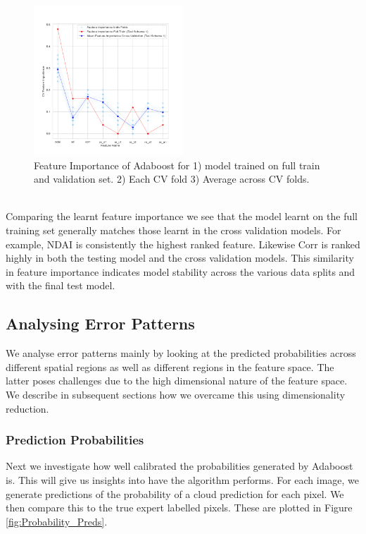 \documentclass[11pt, letterpaper, journal]{IEEEtran}
\begin{document}
\begin{figure}[h]
\centering
\includegraphics[width=0.5\textwidth]{statics/Feature_importance_test_scheme1.png}
\caption{Feature Importance of Adaboost for 1) model trained on full train and validation set. 2) Each CV fold 3) Average across CV folds.}
\label{fig:Feature_importance ts1}
\end{figure}

\\
Comparing the learnt feature importance we see that the model learnt on the full training set generally matches those learnt in the cross validation models. For example, NDAI is consistently the highest ranked feature. Likewise Corr is ranked highly in both the testing model and the cross validation models. This similarity in feature importance indicates model stability across the various data splits and with the final test model. 

\subsection{Analysing Error Patterns}
We analyse error patterns mainly by looking at the predicted probabilities across different spatial regions as well as different regions in the feature space. The latter poses challenges due to the high dimensional nature of the feature space. We describe in subsequent sections how we overcame this using dimensionality reduction.
\subsubsection{Prediction Probabilities}
Next we investigate how well calibrated the probabilities generated by Adaboost is. This will give us insights into have the algorithm performs. For each image, we generate predictions of the probability of a cloud prediction for each pixel. We then compare this to the true expert labelled pixels. These are plotted in Figure \ref{fig:Probability_Preds}.
\end{document}
